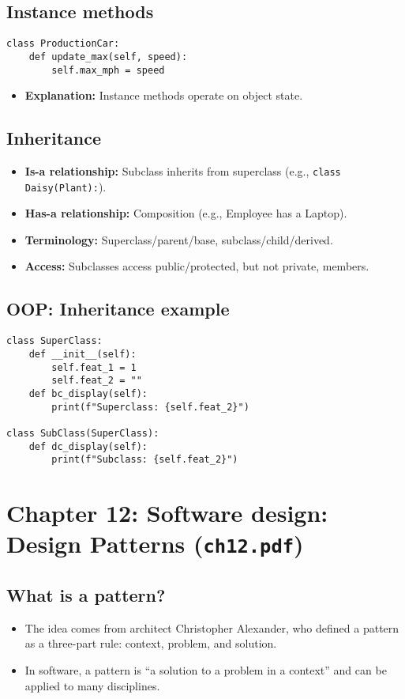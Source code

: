 \documentclass[11pt,a4paper]{article}
\begin{document}
\subsection*{Instance methods}
\begin{verbatim}
class ProductionCar:
    def update_max(self, speed):
        self.max_mph = speed
\end{verbatim}
\begin{itemize}
    \item \textbf{Explanation:} Instance methods operate on object state.
\end{itemize}

\subsection*{Inheritance}
\begin{itemize}
    \item \textbf{Is-a relationship:} Subclass inherits from superclass (e.g., \texttt{class Daisy(Plant):}).
    \item \textbf{Has-a relationship:} Composition (e.g., Employee has a Laptop).
    \item \textbf{Terminology:} Superclass/parent/base, subclass/child/derived.
    \item \textbf{Access:} Subclasses access public/protected, but not private, members.
\end{itemize}

\subsection*{OOP: Inheritance example}
\begin{verbatim}
class SuperClass:
    def __init__(self):
        self.feat_1 = 1
        self.feat_2 = ""
    def bc_display(self):
        print(f"Superclass: {self.feat_2}")

class SubClass(SuperClass):
    def dc_display(self):
        print(f"Subclass: {self.feat_2}")
\end{verbatim}

\section{Chapter 12: Software design: Design Patterns (\texttt{ch12.pdf})}

\subsection*{What is a pattern?}
\begin{itemize}
    \item The idea comes from architect Christopher Alexander, who defined a pattern as a three-part rule: context, problem, and solution.
    \item In software, a pattern is ``a solution to a problem in a context'' and can be applied to many disciplines.
\end{itemize}
\end{document}
